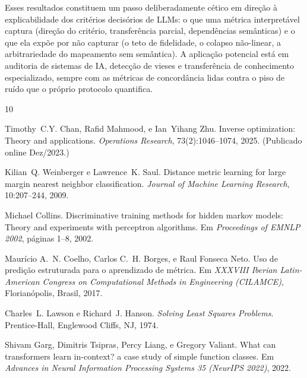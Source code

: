\documentclass[12pt,a4paper]{article}
\begin{document}
Esses resultados constituem um passo deliberadamente cético em direção à explicabilidade
dos critérios decisórios de LLMs: o que uma métrica interpretável captura (direção do
critério, transferência parcial, dependências semânticas) e o que ela expõe por não
capturar (o teto de fidelidade, o colapso não-linear, a arbitrariedade do mapeamento sem
semântica). A aplicação potencial está em auditoria de sistemas de IA, detecção de vieses e
transferência de conhecimento especializado, sempre com as métricas de concordância lidas
contra o piso de ruído que o próprio protocolo quantifica.


\begin{thebibliography}{10}

Timothy~C.Y. Chan, Rafid Mahmood, e Ian~Yihang Zhu.
\newblock Inverse optimization: Theory and applications.
\newblock \emph{Operations Research}, 73(2):1046--1074, 2025.
\newblock (Publicado online Dez/2023.)

Kilian~Q. Weinberger e Lawrence~K. Saul.
\newblock Distance metric learning for large margin nearest neighbor
  classification.
\newblock \emph{Journal of Machine Learning Research}, 10:207--244, 2009.

Michael Collins.
\newblock Discriminative training methods for hidden markov models: Theory and
  experiments with perceptron algorithms.
\newblock Em \emph{Proceedings of EMNLP 2002}, páginas 1--8, 2002.

Maurício A.~N. Coelho, Carlos C.~H. Borges, e Raul Fonseca Neto.
\newblock Uso de predição estruturada para o aprendizado de métrica.
\newblock Em \emph{XXXVIII Iberian Latin-American Congress on Computational Methods
  in Engineering (CILAMCE)}, Florianópolis, Brasil, 2017.

Charles~L. Lawson e Richard~J. Hanson.
\newblock \emph{Solving Least Squares Problems}.
\newblock Prentice-Hall, Englewood Cliffs, NJ, 1974.

Shivam Garg, Dimitris Tsipras, Percy Liang, e Gregory Valiant.
\newblock What can transformers learn in-context? a case study of simple
  function classes.
\newblock Em \emph{Advances in Neural Information Processing Systems 35
  (NeurIPS 2022)}, 2022.


\end{thebibliography}
\end{document}
